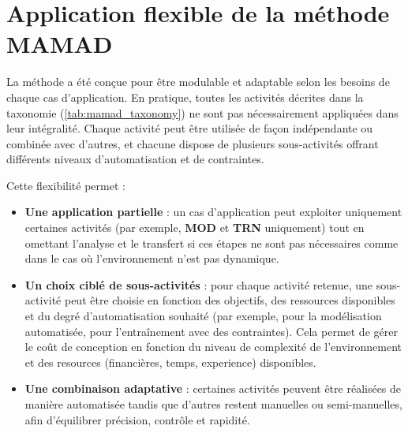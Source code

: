 \section{Application flexible de la méthode MAMAD}
\label{subsec:mamad_flexible}



La méthode  a été conçue pour être modulable et adaptable selon les besoins de chaque cas d'application.
En pratique, toutes les activités décrites dans la taxonomie (\autoref{tab:mamad_taxonomy}) ne sont pas nécessairement appliquées dans leur intégralité.
Chaque activité peut être utilisée de façon indépendante ou combinée avec d'autres, et chacune dispose de plusieurs sous-activités offrant différents niveaux d'automatisation et de contraintes.

Cette flexibilité permet :
\begin{itemize}
  \item \textbf{Une application partielle} : un cas d'application peut exploiter uniquement certaines activités (par exemple, \textbf{MOD} et \textbf{TRN} uniquement) tout en omettant l'analyse et le transfert si ces étapes ne sont pas nécessaires comme dans le cas où l'environnement n'est pas dynamique.
  \item \textbf{Un choix ciblé de sous-activités} : pour chaque activité retenue, une sous-activité peut être choisie en fonction des objectifs, des ressources disponibles et du degré d'automatisation souhaité (par exemple,  pour la modélisation automatisée,  pour l'entraînement avec des contraintes). Cela permet de gérer le coût de conception en fonction du niveau de complexité de l'environnement et des resources (financières, temps, experience) disponibles.
  \item \textbf{Une combinaison adaptative} : certaines activités peuvent être réalisées de manière automatisée tandis que d'autres restent manuelles ou semi-manuelles, afin d'équilibrer précision, contrôle et rapidité.
\end{itemize}

